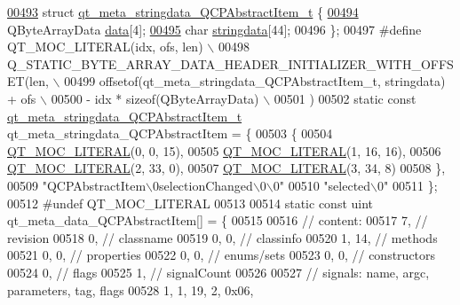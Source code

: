 \begin{DoxyCode}
\hypertarget{a00016_source_l00493}{}\hyperlink{a00016}{00493} \textcolor{keyword}{struct }\hyperlink{a00016_d1/d84/a00097}{qt\_meta\_stringdata\_QCPAbstractItem\_t} \{
\hypertarget{a00016_source_l00494}{}\hyperlink{a00016_ab4317fd8db7c91bab9009e558b7cb145}{00494}     QByteArrayData \hyperlink{a00016_ab4317fd8db7c91bab9009e558b7cb145}{data}[4];
\hypertarget{a00016_source_l00495}{}\hyperlink{a00016_ade6e562aa7d6defc621f68d53679440b}{00495}     \textcolor{keywordtype}{char} \hyperlink{a00016_ade6e562aa7d6defc621f68d53679440b}{stringdata}[44];
00496 \};
00497 \textcolor{preprocessor}{#define QT\_MOC\_LITERAL(idx, ofs, len) \(\backslash\)}
00498 \textcolor{preprocessor}{    Q\_STATIC\_BYTE\_ARRAY\_DATA\_HEADER\_INITIALIZER\_WITH\_OFFSET(len, \(\backslash\)}
00499 \textcolor{preprocessor}{    offsetof(qt\_meta\_stringdata\_QCPAbstractItem\_t, stringdata) + ofs \(\backslash\)}
00500 \textcolor{preprocessor}{        - idx * sizeof(QByteArrayData) \(\backslash\)}
00501 \textcolor{preprocessor}{    )}
00502 \textcolor{keyword}{static} \textcolor{keyword}{const} \hyperlink{a00016_d1/d84/a00097}{qt\_meta\_stringdata\_QCPAbstractItem\_t} 
      qt\_meta\_stringdata\_QCPAbstractItem = \{
00503     \{
00504 \hyperlink{a00016_a75bb9482d242cde0a06c9dbdc6b83abe}{QT\_MOC\_LITERAL}(0, 0, 15),
00505 \hyperlink{a00016_a75bb9482d242cde0a06c9dbdc6b83abe}{QT\_MOC\_LITERAL}(1, 16, 16),
00506 \hyperlink{a00016_a75bb9482d242cde0a06c9dbdc6b83abe}{QT\_MOC\_LITERAL}(2, 33, 0),
00507 \hyperlink{a00016_a75bb9482d242cde0a06c9dbdc6b83abe}{QT\_MOC\_LITERAL}(3, 34, 8)
00508     \},
00509     \textcolor{stringliteral}{"QCPAbstractItem\(\backslash\)0selectionChanged\(\backslash\)0\(\backslash\)0"}
00510     \textcolor{stringliteral}{"selected\(\backslash\)0"}
00511 \};
00512 \textcolor{preprocessor}{#undef QT\_MOC\_LITERAL}
00513 
00514 \textcolor{keyword}{static} \textcolor{keyword}{const} uint qt\_meta\_data\_QCPAbstractItem[] = \{
00515 
00516  \textcolor{comment}{// content:}
00517        7,       \textcolor{comment}{// revision}
00518        0,       \textcolor{comment}{// classname}
00519        0,    0, \textcolor{comment}{// classinfo}
00520        1,   14, \textcolor{comment}{// methods}
00521        0,    0, \textcolor{comment}{// properties}
00522        0,    0, \textcolor{comment}{// enums/sets}
00523        0,    0, \textcolor{comment}{// constructors}
00524        0,       \textcolor{comment}{// flags}
00525        1,       \textcolor{comment}{// signalCount}
00526 
00527  \textcolor{comment}{// signals: name, argc, parameters, tag, flags}
00528        1,    1,   19,    2, 0x06,

\end{DoxyCode}
